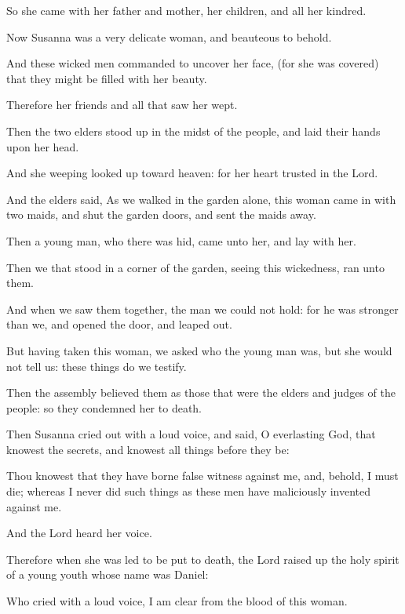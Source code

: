 {\par }{\PP {}So she came with her father and mother, her children, and all her kindred.
\par }{\PP {}Now Susanna was a very delicate woman, and beauteous to behold.
\par }{\PP {}And these wicked men commanded to uncover her face, (for she was covered) that they might be filled with her beauty.
\par }{\PP {}Therefore her friends and all that saw her wept.
\par }{\PP {}Then the two elders stood up in the midst of the people, and laid their hands upon her head.
\par }{\PP {}And she weeping looked up toward heaven: for her heart trusted in the Lord.
\par }{\PP {}And the elders said, As we walked in the garden alone, this woman came in with two maids, and shut the garden doors, and sent the maids away.
\par }{\PP {}Then a young man, who there was hid, came unto her, and lay with her.
\par }{\PP {}Then we that stood in a corner of the garden, seeing this wickedness, ran unto them.
\par }{\PP {}And when we saw them together, the man we could not hold: for he was stronger than we, and opened the door, and leaped out.
\par }{\PP {}But having taken this woman, we asked who the young man was, but she would not tell us: these things do we testify.
\par }{\PP {}Then the assembly believed them as those that were the elders and judges of the people: so they condemned her to death.
\par }{\PP {}Then Susanna cried out with a loud voice, and said, O everlasting God, that knowest the secrets, and knowest all things before they be:
\par }{\PP {}Thou knowest that they have borne false witness against me, and, behold, I must die; whereas I never did such things as these men have maliciously invented against me.
\par }{\PP {}And the Lord heard her voice.
\par }{\PP {}Therefore when she was led to be put to death, the Lord raised up the holy spirit of a young youth whose name was Daniel:
\par }{\PP {}Who cried with a loud voice, I am clear from the blood of this woman.
}
